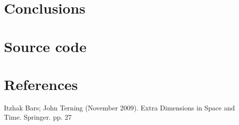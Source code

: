 \documentclass{aa}   %
\begin{document}
\section{Conclusions} \label{sec:conclusions}

\section{Source code}\label{sec:files}


\section{References}
Itzhak Bars; John Terning (November 2009). Extra Dimensions in Space and Time. Springer. pp. 27

\end{document}
